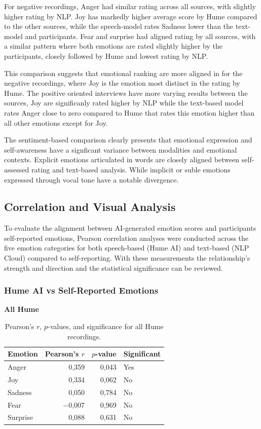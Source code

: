 For negative recordings, Anger had similar rating across all sources, with slightly higher rating by NLP.  Joy has markedly higher average score by Hume compared to the other sources, while the speech-model rates Sadness lower than the text-model and participants. 
Fear and surprise had aligned rating by all sources, with a similar pattern where both emotions are rated slightly higher by the participants, closely followed by Hume and lowest rating by NLP. 

This comparison suggests that emotional ranking are more aligned in for the negative recordings, where Joy is the emotion most distinct in the rating by Hume. 
The positive oriented interviews have more varying results between the sources, Joy are significanly rated higher by NLP while the text-based model rates Anger close to zero compared to Hume that rates this emotion higher than all other emotions except for Joy. 

The sentiment-based comparison clearly presents that emotional expression and self-awareness have a signficant variance between modalities and emotional contexts. 
Explicit emotions articulated in words are closely aligned between self-assessed rating and text-based analysis. 
While implicit or suble emotions expressed through vocal tone have a notable divergence. 

\subsection{Correlation and Visual Analysis}
To evaluate the alignment between AI-generated emotion scores and participants self-reported emotions, 
Pearson correlation analyses were conducted across the five emotion categories for both speech-based (Hume AI) and text-based (NLP Cloud) compared to self-reporting.
With these measurements the relationship's strength and direction and the statistical significance can be reviewed. 

\subsubsection{Hume AI vs Self-Reported Emotions}
\begin{table}[H]
    \centering
    \caption*{\textbf{All Hume}}
    \begin{tabular}{lrrl}
      \toprule
      \textbf{Emotion} & \textbf{Pearson’s \(r\)} & \textbf{\(p\)-value} & \textbf{Significant} \\
      \midrule
      Anger    & 0,359 & 0,043 & Yes \\
      Joy      & 0,334 & 0,062 & No  \\
      Sadness  & 0,050 & 0,784 & No  \\
      Fear     & \(-\)0,007 & 0,969 & No  \\
      Surprise & 0,088 & 0,631 & No  \\
      \bottomrule
    \end{tabular}
    \caption{Pearson’s \(r\), \(p\)-values, and significance for all Hume recordings.}
    \label{tab:rq3_corr-hume-all}
  \end{table}

